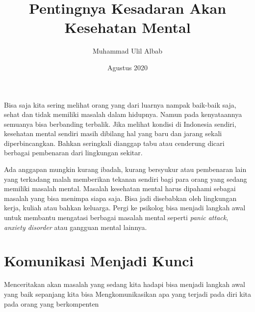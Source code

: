 \documentclass{article}
\title{Pentingnya Kesadaran Akan Kesehatan Mental}
\author{Muhammad Ulil Albab }
\date{Agustus 2020}
\begin{document}
\maketitle

Bisa saja kita sering melihat orang yang dari luarnya nampak baik-baik saja, sehat dan tidak memiliki masalah dalam hidupnya. Namun pada kenyataannya semuanya bisa berbanding terbalik. Jika melihat kondisi di Indonesia sendiri, kesehatan mental sendiri masih dibilang hal yang baru dan jarang sekali diperbincangkan. Bahkan seringkali dianggap tabu atau cenderung dicari berbagai pembenaran dari lingkungan sekitar.  \par
Ada anggapan mungkin kurang ibadah, kurang bersyukur atau pembenaran lain yang terkadang malah memberikan tekanan sendiri bagi para orang yang sedang memiliki masalah mental. Masalah kesehatan mental harus dipahami sebagai masalah yang bisa menimpa siapa saja. Bisa jadi disebabkan oleh lingkungan kerja, kuliah atau bahkan keluarga. Pergi ke psikolog bisa menjadi langkah awal untuk membantu mengatasi berbagai masalah mental seperti \textit{panic attack}, \textit{anxiety disorder} atau gangguan mental lainnya.  

\section{Komunikasi Menjadi Kunci}
Menceritakan akan masalah yang sedang kita hadapi bisa menjadi langkah awal yang baik sepanjang kita bisa Mengkomunikasikan apa yang terjadi pada diri kita pada orang yang berkompenten \cite{ayuningtyas2018analisis}
\end{document}
